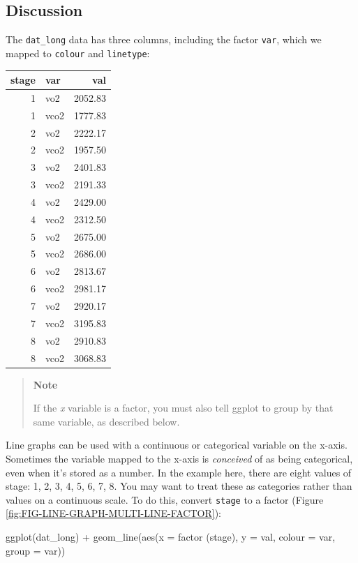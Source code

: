 \documentclass[
]{book}
\newenvironment{Shaded}{\begin{snugshade}}{\end{snugshade}}
\newcommand{\AttributeTok}[1]{\textcolor[rgb]{0.77,0.63,0.00}{#1}}
\newcommand{\FunctionTok}[1]{\textcolor[rgb]{0.00,0.00,0.00}{#1}}
\newcommand{\NormalTok}[1]{#1}
\newcommand{\SpecialCharTok}[1]{\textcolor[rgb]{0.00,0.00,0.00}{#1}}
\begin{document}
\hypertarget{discussion-13}{%
\subsection{Discussion}\label{discussion-13}}

The \texttt{dat\_long} data has three columns, including the factor \texttt{var}, which we mapped to \texttt{colour} and \texttt{linetype}:

\begin{tabular}{r|l|r}
\hline
stage & var & val\\
\hline
1 & vo2 & 2052.83\\
\hline
1 & vco2 & 1777.83\\
\hline
2 & vo2 & 2222.17\\
\hline
2 & vco2 & 1957.50\\
\hline
3 & vo2 & 2401.83\\
\hline
3 & vco2 & 2191.33\\
\hline
4 & vo2 & 2429.00\\
\hline
4 & vco2 & 2312.50\\
\hline
5 & vo2 & 2675.00\\
\hline
5 & vco2 & 2686.00\\
\hline
6 & vo2 & 2813.67\\
\hline
6 & vco2 & 2981.17\\
\hline
7 & vo2 & 2920.17\\
\hline
7 & vco2 & 3195.83\\
\hline
8 & vo2 & 2910.83\\
\hline
8 & vco2 & 3068.83\\
\hline
\end{tabular}

\begin{quote}
\textbf{Note}

If the \emph{x} variable is a factor, you must also tell ggplot to group by that same variable, as described below.
\end{quote}

Line graphs can be used with a continuous or categorical variable on the x-axis. Sometimes the variable mapped to the x-axis is \emph{conceived} of as being categorical, even when it's stored as a number. In the example here, there are eight values of stage: 1, 2, 3, 4, 5, 6, 7, 8. You may want to treat these as categories rather than values on a continuous scale. To do this, convert \texttt{stage} to a factor (Figure \ref{fig:FIG-LINE-GRAPH-MULTI-LINE-FACTOR}):

\begin{Shaded}
\begin{Highlighting}[]

\FunctionTok{ggplot}\NormalTok{(dat\_long) }\SpecialCharTok{+}
  \FunctionTok{geom\_line}\NormalTok{(}\FunctionTok{aes}\NormalTok{(}\AttributeTok{x =} \FunctionTok{factor}\NormalTok{ (stage), }\AttributeTok{y =}\NormalTok{ val, }\AttributeTok{colour =}\NormalTok{ var, }\AttributeTok{group =}\NormalTok{ var))}
\end{Highlighting}
\end{Shaded}
\end{document}
